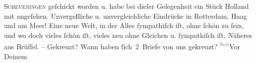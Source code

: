 \begin{ledgroupsized}[t]{13cm}
                  \textsc{Scheveningen} geſchickt worden u. habe bei dieſer Gelegenheit ein Stück Holland mit angeſehen. Unvergeßliche u. unvergleichliche
               Eindrücke in Rotterdam, Haag und am Meer! Eine neue Welt, in der Alles ſympathiſch
               iſt,  ohne ſchön zu ſein, und wo doch vieles
               ſchön iſt, vieles neu ohne Gleichen u. ſympathiſch iſt. Näheres aus Brüſſel. – Gekreuzt? Wann haben ſich 2 Briefe von uns gekreuzt? \substVorne{}\textsuperscript{\textcolor{gray}{Seit}}\substDazwischen{}Vor\substHinten{} Deinem \label{T_L02666-1v}\label{T_L02666-1h}{ }\label{T_L02666-2v}\label{T_L02666-2h}\pend
                     \endnumbering{}\end{ledgroupsized}  \newcommand{\dateiname}{L02666}\newcommand{\titel}{Paul Goldmann an Arthur Schnitzler, 5. 7. 1891}\newcommand{\editorInnen}{Martin Anton Müller und Laura Untner}
            \footnotesize
\begin{ledgroupsized}[t]{11.5cm}
\end{ledgroupsized}
         
      